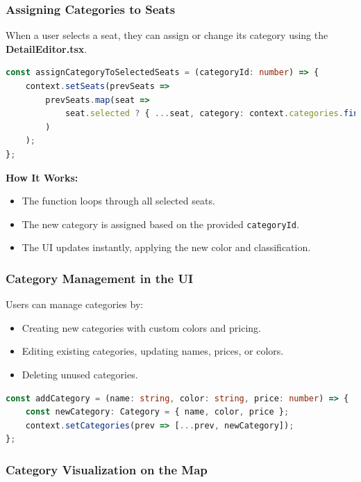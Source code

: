 \subsubsection{Assigning Categories to Seats}

When a user selects a seat, they can assign or change its category using the \textbf{DetailEditor.tsx}.

\begin{lstlisting}[language=TypeScript, caption=Assigning Categories to Selected Seats, label=lst:assign-category]
const assignCategoryToSelectedSeats = (categoryId: number) => {
    context.setSeats(prevSeats => 
        prevSeats.map(seat => 
            seat.selected ? { ...seat, category: context.categories.find(c => c.id === categoryId) } : seat
        )
    );
};
\end{lstlisting}

\textbf{How It Works:}
\begin{itemize}
    \item The function loops through all selected seats.
    \item The new category is assigned based on the provided \texttt{categoryId}.
    \item The UI updates instantly, applying the new color and classification.
\end{itemize}

\subsubsection{Category Management in the UI}

Users can manage categories by:
\begin{itemize}
    \item Creating new categories with custom colors and pricing.
    \item Editing existing categories, updating names, prices, or colors.
    \item Deleting unused categories.
\end{itemize}

\begin{lstlisting}[language=TypeScript, caption=Managing Categories in Settings, label=lst:manage-categories]
const addCategory = (name: string, color: string, price: number) => {
    const newCategory: Category = { name, color, price };
    context.setCategories(prev => [...prev, newCategory]);
};
\end{lstlisting}

\subsubsection{Category Visualization on the Map}


